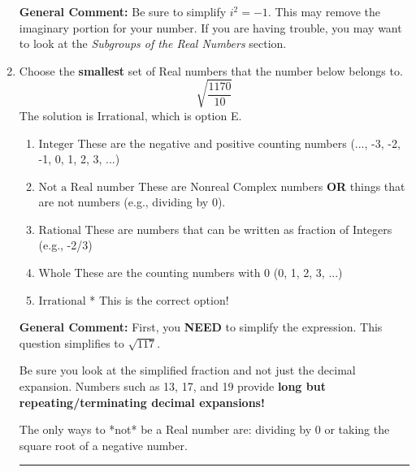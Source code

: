 \documentclass{extbook}[14pt]
\newcommand{\litem}[1]{\item #1

\rule{\textwidth}{0.4pt}}
\begin{document}
\begin{enumerate}
{\textbf{General Comment:} Be sure to simplify $i^2 = -1$. This may remove the imaginary portion for your number. If you are having trouble, you may want to look at the \textit{Subgroups of the Real Numbers} section.
}
\litem{
Choose the \textbf{smallest} set of Real numbers that the number below belongs to.
\[ \sqrt{\frac{1170}{10}} \]
The solution is \( \text{Irrational} \), which is option E.\begin{enumerate}[label=\Alph*.]
\item \( \text{Integer} \)
These are the negative and positive counting numbers (..., -3, -2, -1, 0, 1, 2, 3, ...)
\item \( \text{Not a Real number} \)
These are Nonreal Complex numbers \textbf{OR} things that are not numbers (e.g., dividing by 0).
\item \( \text{Rational} \)
These are numbers that can be written as fraction of Integers (e.g., -2/3)
\item \( \text{Whole} \)
These are the counting numbers with 0 (0, 1, 2, 3, ...)
\item \( \text{Irrational} \)
* This is the correct option!
\end{enumerate}

\textbf{General Comment:} First, you \textbf{NEED} to simplify the expression. This question simplifies to $\sqrt{117}$. 
 
 Be sure you look at the simplified fraction and not just the decimal expansion. Numbers such as 13, 17, and 19 provide \textbf{long but repeating/terminating decimal expansions!} 
 
 The only ways to *not* be a Real number are: dividing by 0 or taking the square root of a negative number. 
 
}
\end{enumerate}
\end{document}
